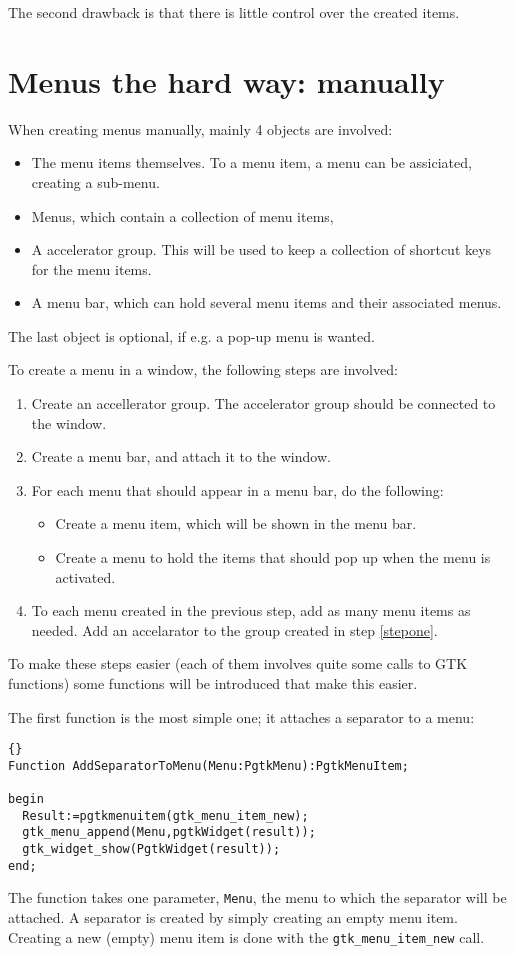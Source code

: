 \documentclass[10pt]{article}
\begin{document}
The second drawback is that there is little control over the created items.

\section{Menus the hard way: manually}
When creating menus manually, mainly 4 objects are involved:
\begin{itemize}
\item The menu items themselves. To a menu item, a menu can be assiciated,
creating a sub-menu.
\item Menus, which contain a collection of menu items,
\item A accelerator group. This will be used to keep a collection of
shortcut keys for the menu items.
\item A menu bar, which can hold several menu items and their associated
menus. 
\end{itemize}
The last object is optional, if e.g. a pop-up menu is wanted.

To create a menu in a window, the following steps are involved:
\begin{enumerate}
\item Create an accellerator group. The accelerator group should be
connected to the window. \label{stepone}
\item Create a menu bar, and attach it to the window.
\item For each menu that should appear in a menu bar, do the following:
\begin{itemize}
\item Create a menu item, which will be shown in the menu bar.
\item Create a menu to hold the items that should pop up when the menu is
activated.
\end{itemize}
\item To each menu created in the previous step, add as many menu items as
needed. Add an accelarator to the group created in step \ref{stepone}.
\end{enumerate}

To make these steps easier (each of them involves quite some calls to GTK
functions) some functions will be introduced that make this easier.

The first function is the most simple one; it attaches a separator to a
menu:
\begin{lstlisting}{}
Function AddSeparatorToMenu(Menu:PgtkMenu):PgtkMenuItem;

begin
  Result:=pgtkmenuitem(gtk_menu_item_new); 
  gtk_menu_append(Menu,pgtkWidget(result));
  gtk_widget_show(PgtkWidget(result));
end;
\end{lstlisting}
The function takes one parameter, \lstinline|Menu|, the menu to which the
separator will be attached. A separator is created by simply creating an
empty menu item. Creating a new (empty) menu item is done with the
\lstinline|gtk_menu_item_new| call. 
\end{document}
